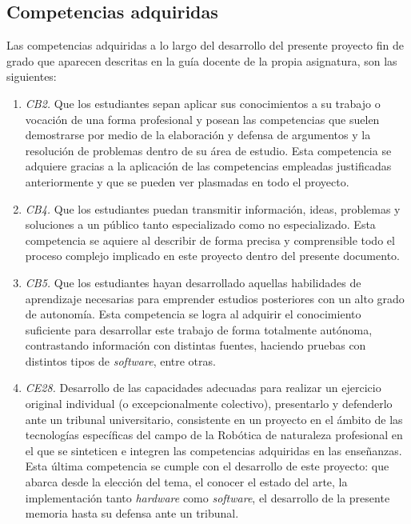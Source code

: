 \subsection{Competencias adquiridas}

Las competencias adquiridas a lo largo del desarrollo del presente proyecto fin de grado que aparecen descritas en la guía docente de la propia asignatura, son las siguientes: 

\begin{enumerate}
	\item{\textit{CB2.} Que los estudiantes sepan aplicar sus conocimientos a su trabajo o vocación de una forma profesional y posean las competencias que suelen demostrarse por medio de la elaboración y defensa de argumentos y la resolución de problemas dentro de su área de estudio. 
	Esta competencia se adquiere gracias a la aplicación de las competencias empleadas justificadas anteriormente y que se pueden ver plasmadas en todo el proyecto.}
	\item{\textit{CB4.} Que los estudiantes puedan transmitir información, ideas, problemas y soluciones a un público tanto especializado como no especializado. 
	Esta competencia se aquiere al describir de forma precisa y comprensible todo el proceso complejo implicado en este proyecto dentro del presente documento.}
	\item{\textit{CB5.} Que los estudiantes hayan desarrollado aquellas habilidades de aprendizaje necesarias para emprender estudios posteriores con un alto grado de autonomía. 
	Esta competencia se logra al adquirir el conocimiento suficiente para desarrollar este trabajo de forma totalmente autónoma, contrastando información con distintas fuentes, haciendo pruebas con distintos tipos de \textit{software}, entre otras.}
	\item{\textit{CE28.} Desarrollo de las capacidades adecuadas para realizar un ejercicio original individual (o excepcionalmente colectivo), presentarlo y defenderlo ante un tribunal universitario, consistente en un proyecto en el ámbito de las tecnologías específicas del campo de la Robótica de naturaleza profesional en el que se sinteticen e integren las competencias adquiridas en las enseñanzas.
	Esta última competencia se cumple con el desarrollo de este proyecto: que abarca desde la elección del tema, el conocer el estado del arte, la implementación tanto \textit{hardware} como \textit{software}, el desarrollo de la presente memoria hasta su defensa ante un tribunal.}
\end{enumerate}


